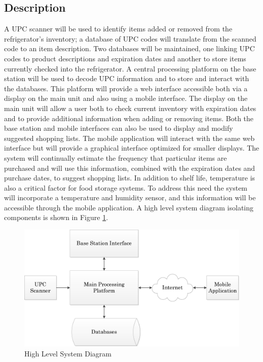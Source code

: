\documentclass[11pt]{article} %
\begin{document}
\subsection{Description}
A UPC scanner will be used to identify items added or removed from the refrigerator's inventory; a database of UPC codes will translate from the scanned code to an item description. Two databases will be maintained, one linking UPC codes to product descriptions and expiration dates and another to store items currently checked into the refrigerator. A central processing platform on the base station will be used to decode UPC information and to store and interact with the databases. This platform will provide a web interface accessible both via a display on the main unit and also using a mobile interface. The display on the main unit will allow a user both to check current inventory with expiration dates and to provide additional information when adding or removing items. Both the base station and mobile interfaces can also be used to display and modify suggested shopping lists. The mobile application will interact with the same web interface but will provide a graphical interface optimized for smaller displays. The system will continually estimate the frequency that particular items are purchased and will use this information, combined with the expiration dates and purchase dates, to suggest shopping lists. In addition to shelf life, temperature is also a critical factor for food storage systems. To address this need the system will incorporate a temperature and humidity sensor, and this information will be accessible through the mobile application.
\newline \quad \newline
A high level system diagram isolating components is shown in Figure \ref{fig:sysdiag}.
\begin{figure}[h]
\begin{center}
\vspace{0.5cm}
\includegraphics[scale=0.7]{HighestLevelDiagram}
\caption{High Level System Diagram}
\label{fig:sysdiag}
\end{center}
\end{figure}
\pagebreak
\end{document}
